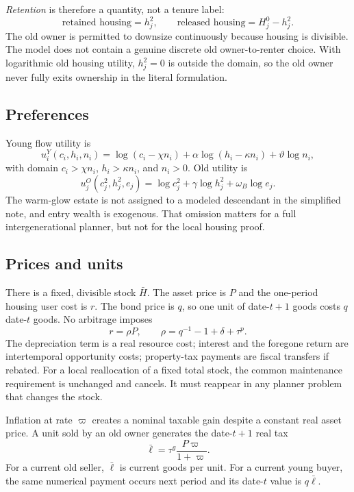 \documentclass[11pt]{article}
\newcommand{\1}{\mathbf 1}
\newcommand{\ellbar}{\bar\ell}
\begin{document}
\textit{Retention} is therefore a quantity, not a tenure label:
\[
\text{retained housing}=h_j^2,
\qquad
\text{released housing}=H_j^0-h_j^2.
\]
The old owner is permitted to downsize continuously because housing is
divisible. The model does not contain a genuine discrete old owner-to-renter
choice. With logarithmic old housing utility, $h_j^2=0$ is outside the domain,
so the old owner never fully exits ownership in the literal formulation.

\subsection{Preferences}

Young flow utility is
\begin{equation}
u_i^Y(c_i,h_i,n_i)
=\log(c_i-\chi n_i)+\alpha\log(h_i-\kappa n_i)
+\vartheta\log n_i,
\label{eq:young_utility}
\end{equation}
with domain $c_i>\chi n_i$, $h_i>\kappa n_i$, and $n_i>0$. Old utility is
\begin{equation}
u_j^O(c_j^2,h_j^2,e_j)
=\log c_j^2+\gamma\log h_j^2+\omega_B\log e_j.
\label{eq:old_utility}
\end{equation}
The warm-glow estate is not assigned to a modeled descendant in the simplified
note, and entry wealth is exogenous. That omission matters for a full
intergenerational planner, but not for the local housing proof.

\subsection{Prices and units}

There is a fixed, divisible stock $\bar H$. The asset price is $P$ and the
one-period housing user cost is $r$. The bond price is $q$, so one unit of
date-$t+1$ goods costs $q$ date-$t$ goods. No arbitrage imposes
\begin{equation}
r=\rho P,
\qquad
\rho=q^{-1}-1+\delta+\tau^p.
\label{eq:user_cost}
\end{equation}
The depreciation term is a real resource cost; interest and the foregone
return are intertemporal opportunity costs; property-tax payments are fiscal
transfers if rebated. For a local reallocation of a fixed total stock, the
common maintenance requirement is unchanged and cancels. It must reappear in
any planner problem that changes the stock.

Inflation at rate $\varpi$ creates a nominal taxable gain despite a constant
real asset price. A unit sold by an old owner generates the date-$t+1$ real tax
\begin{equation}
\ellbar=\tau^g\frac{P\varpi}{1+\varpi}.
\label{eq:gains_tax}
\end{equation}
For a current old seller, $\ellbar$ is current goods per unit. For a current
young buyer, the same numerical payment occurs next period and its date-$t$
value is $q\ellbar$.
\end{document}
